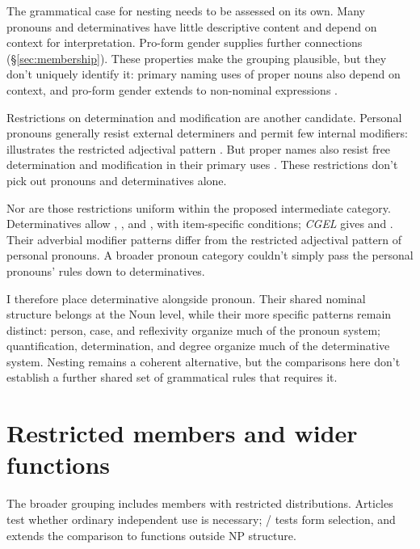 \documentclass[12pt]{article}
\begin{document}
The grammatical case for nesting needs to be assessed on its own. Many pronouns and determinatives have little descriptive content and depend on context for interpretation. Pro-form gender supplies further connections (§\ref{sec:membership}). These properties make the grouping plausible, but they don't uniquely identify it: primary naming uses of proper nouns also depend on context, and pro-form gender extends to non-nominal expressions \citep{reynolds2025proformgender}.

Restrictions on determination and modification are another candidate. Personal pronouns generally resist external determiners and permit few internal modifiers:  illustrates the restricted adjectival pattern \citep[429--430]{huddleston2002}. But proper names also resist free determination and modification in their primary uses \citep[517, 519--520]{huddleston2002}. These restrictions don't pick out pronouns and determinatives alone.

Nor are those restrictions uniform within the proposed intermediate category. Determinatives allow , , and , with item-specific conditions; \textit{CGEL} gives  and  \citep[415--416]{huddleston2002}. Their adverbial modifier patterns differ from the restricted adjectival pattern of personal pronouns. A broader pronoun category couldn't simply pass the personal pronouns' rules down to determinatives.

I therefore place determinative alongside pronoun. Their shared nominal structure belongs at the Noun level, while their more specific patterns remain distinct: person, case, and reflexivity organize much of the pronoun system; quantification, determination, and degree organize much of the determinative system. Nesting remains a coherent alternative, but the comparisons here don't establish a further shared set of grammatical rules that requires it.

\section{Restricted members and wider functions}\label{sec:articles}

The broader grouping includes members with restricted distributions. Articles test whether ordinary independent use is necessary; / tests form selection, and  extends the comparison to functions outside NP structure.
\end{document}
